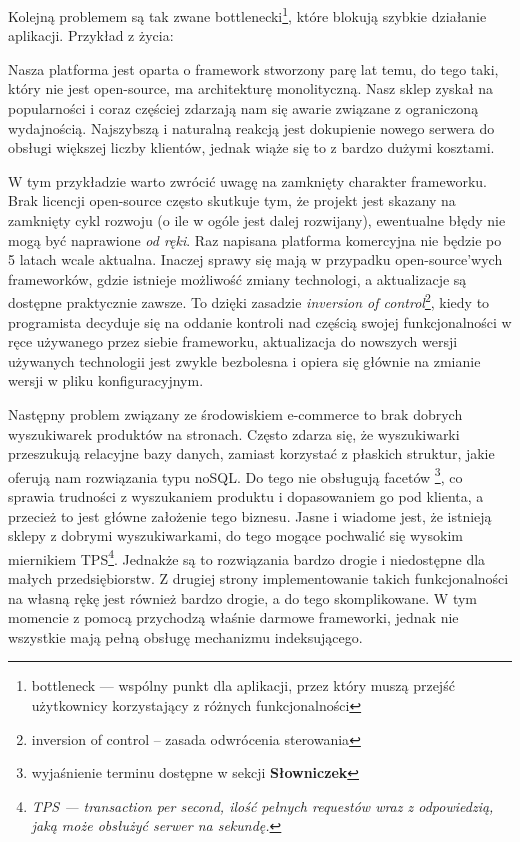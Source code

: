Kolejną problemem są tak zwane bottlenecki\footnote{bottleneck — wspólny punkt dla aplikacji, przez który muszą przejść użytkownicy korzystający z różnych funkcjonalności}, które blokują szybkie działanie aplikacji. Przykład z życia: 
\begin{example}
	Nasza platforma jest oparta o framework stworzony parę lat temu, do tego taki, który nie jest open-source, ma architekturę monolityczną. Nasz sklep zyskał na popularności i coraz częściej zdarzają nam się awarie związane z ograniczoną wydajnością. Najszybszą i naturalną reakcją jest dokupienie nowego serwera do obsługi większej liczby klientów, jednak wiąże się to z bardzo dużymi kosztami.
\end{example} 
W tym przykładzie warto zwrócić uwagę na zamknięty charakter frameworku. Brak licencji open-source często skutkuje tym, że projekt jest skazany na zamknięty cykl rozwoju (o ile w ogóle jest dalej rozwijany), ewentualne błędy nie mogą być naprawione \textit{od ręki}. Raz napisana platforma komercyjna nie będzie po 5 latach wcale aktualna. Inaczej sprawy się mają w przypadku open-source'wych frameworków, gdzie istnieje możliwość zmiany technologi, a aktualizacje są dostępne praktycznie zawsze. To dzięki zasadzie \textit{inversion of control}\footnote{inversion of control -- zasada odwrócenia sterowania}, kiedy to programista decyduje się na oddanie kontroli nad częścią swojej funkcjonalności w ręce używanego przez siebie frameworku, aktualizacja do nowszych wersji używanych technologii jest zwykle bezbolesna i opiera się głównie na zmianie wersji w pliku konfiguracyjnym.

Następny problem związany ze środowiskiem e-commerce to brak dobrych wyszukiwarek produktów na stronach. Często zdarza się, że wyszukiwarki przeszukują relacyjne bazy danych, zamiast korzystać z płaskich struktur, jakie oferują nam rozwiązania typu noSQL. Do tego nie obsługują facetów \footnote{wyjaśnienie terminu dostępne w sekcji \textbf{Słowniczek}}, co sprawia trudności z wyszukaniem produktu i dopasowaniem go pod klienta, a przecież to jest główne założenie tego biznesu. Jasne i wiadome jest, że istnieją sklepy z dobrymi wyszukiwarkami, do tego mogące pochwalić się wysokim miernikiem TPS\footnote{\textit{TPS — transaction per second, ilość pełnych requestów wraz z odpowiedzią, jaką może obsłużyć serwer na sekundę.}}. Jednakże są to rozwiązania bardzo drogie i niedostępne dla małych przedsiębiorstw. Z drugiej strony implementowanie takich funkcjonalności na własną rękę jest również bardzo drogie, a do tego skomplikowane. W tym momencie z pomocą przychodzą właśnie darmowe frameworki, jednak nie wszystkie mają pełną obsługę mechanizmu indeksującego.

